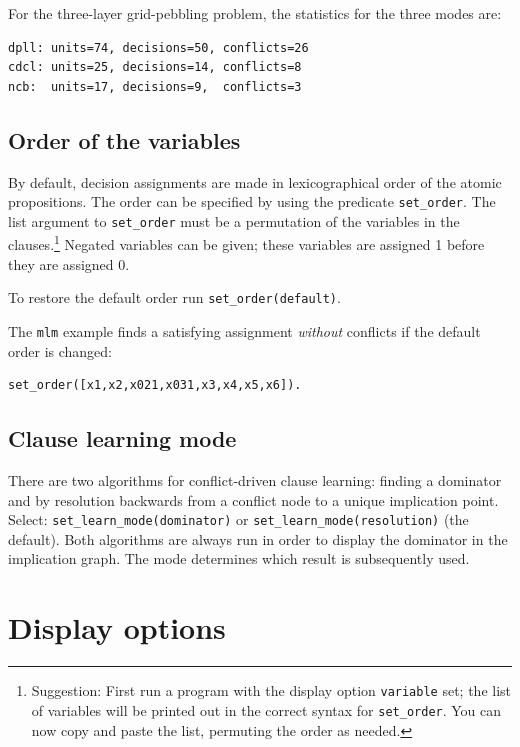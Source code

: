 \documentclass[11pt]{article}
\newcommand*{\p}[1]{\textup{\texttt{#1}}}
\begin{document}
For the three-layer grid-pebbling problem, the statistics for the three
modes are:
\begin{verbatim}
dpll: units=74, decisions=50, conflicts=26
cdcl: units=25, decisions=14, conflicts=8
ncb:  units=17, decisions=9,  conflicts=3
\end{verbatim}

\subsection{Order of the variables}

By default, decision assignments are made in lexicographical order of
the atomic propositions. The order can be specified by using the
predicate \p{set\_order}. The list argument to \p{set\_order} must be a
permutation of the variables in the clauses.\footnote{Suggestion: First
run a program with the display option \p{variable} set; the list of
variables will be printed out in the correct syntax for \p{set\_order}.
You can now copy and paste the list, permuting the order as needed.}
Negated variables can be given; these variables are assigned 1 before
they are assigned 0.

To restore the default order run \p{set\_order(default)}.

The \p{mlm} example finds a satisfying assignment \emph{without}
conflicts if the default order is changed:

\begin{verbatim}
set_order([x1,x2,x021,x031,x3,x4,x5,x6]).
\end{verbatim}

\subsection{Clause learning mode}

There are two algorithms for conflict-driven clause learning: finding a
dominator and by resolution backwards from a conflict node to a unique
implication point. Select: \p{set\_learn\_mode(dominator)} or
\p{set\_learn\_mode(resolution)} (the default). Both algorithms are
always run in order to display the dominator in the implication graph.
The mode determines which result is subsequently used.

\newpage

\section{Display options}
\end{document}
